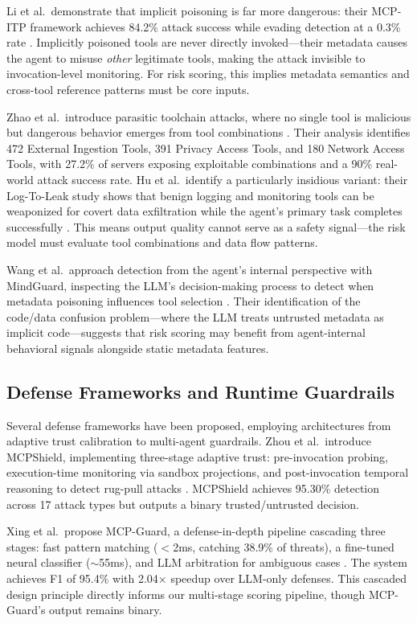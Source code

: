 \documentclass[12pt]{article}
\begin{document}
Li et al.\ demonstrate that implicit poisoning is far more dangerous: their MCP-ITP framework achieves 84.2\% attack success while evading detection at a 0.3\% rate \cite{li2026mcp_itp}. Implicitly poisoned tools are never directly invoked---their metadata causes the agent to misuse \emph{other} legitimate tools, making the attack invisible to invocation-level monitoring. For risk scoring, this implies metadata semantics and cross-tool reference patterns must be core inputs.

Zhao et al.\ introduce parasitic toolchain attacks, where no single tool is malicious but dangerous behavior emerges from tool combinations \cite{zhao2025mind_your_server}. Their analysis identifies 472 External Ingestion Tools, 391 Privacy Access Tools, and 180 Network Access Tools, with 27.2\% of servers exposing exploitable combinations and a 90\% real-world attack success rate. Hu et al.\ identify a particularly insidious variant: their Log-To-Leak study shows that benign logging and monitoring tools can be weaponized for covert data exfiltration while the agent’s primary task completes successfully \cite{hu2026log_to_leak}. This means output quality cannot serve as a safety signal---the risk model must evaluate tool combinations and data flow patterns.

Wang et al.\ approach detection from the agent’s internal perspective with MindGuard, inspecting the LLM’s decision-making process to detect when metadata poisoning influences tool selection \cite{wang2026mindguard}. Their identification of the code/data confusion problem---where the LLM treats untrusted metadata as implicit code---suggests that risk scoring may benefit from agent-internal behavioral signals alongside static metadata features.

\subsection{Defense Frameworks and Runtime Guardrails}

Several defense frameworks have been proposed, employing architectures from adaptive trust calibration to multi-agent guardrails. Zhou et al.\ introduce MCPShield, implementing three-stage adaptive trust: pre-invocation probing, execution-time monitoring via sandbox projections, and post-invocation temporal reasoning to detect rug-pull attacks \cite{zhou2026mcpshield}. MCPShield achieves 95.30\% detection across 17 attack types but outputs a binary trusted/untrusted decision.

Xing et al.\ propose MCP-Guard, a defense-in-depth pipeline cascading three stages: fast pattern matching ($<$2ms, catching 38.9\% of threats), a fine-tuned neural classifier ($\sim$55ms), and LLM arbitration for ambiguous cases \cite{xing2026mcp_guard}. The system achieves F1 of 95.4\% with 2.04$\times$ speedup over LLM-only defenses. This cascaded design principle directly informs our multi-stage scoring pipeline, though MCP-Guard’s output remains binary.
\end{document}
